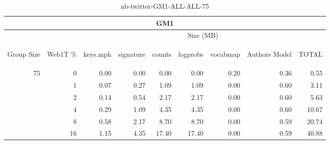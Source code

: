 \begin{center}
\begin{table}[htbp] 
 \begin{center}
\begin{tabular}{ | r | r | r | r | r | r | r | r | r |}
\hline
\multicolumn{9}{|c|}{GM1}\\
\hline
 & & \multicolumn{7}{|c|}{Size (MB)}\\ \cline{3-9}
\begin{sideways}Group Size\end{sideways} & \begin{sideways}Web1T \% \end{sideways} & \begin{sideways}keys.mph\end{sideways} & \begin{sideways}signature\end{sideways} & \begin{sideways}counts\end{sideways} & \begin{sideways}logprobs\end{sideways} & \begin{sideways}vocabmap\end{sideways} & \begin{sideways}Authors Model \end{sideways} & \begin{sideways}TOTAL\end{sideways}\\
\hline
\multirow{5}{*}{75}
 & 0 & 0.00 & 0.00 & 0.00 & 0.00 & 0.20 & 0.36 & 0.55\\ \cline{2-9}
 & 1 & 0.07 & 0.27 & 1.09 & 1.09 & 0.00 & 0.60 & 3.11\\ \cline{2-9}
 & 2 & 0.14 & 0.54 & 2.17 & 2.17 & 0.00 & 0.60 & 5.63\\ \cline{2-9}
 & 4 & 0.29 & 1.09 & 4.35 & 4.35 & 0.00 & 0.60 & 10.67\\ \cline{2-9}
 & 8 & 0.58 & 2.17 & 8.70 & 8.70 & 0.00 & 0.59 & 20.74\\ \cline{2-9}
 & 16 & 1.15 & 4.35 & 17.40 & 17.40 & 0.00 & 0.59 & 40.88\\ \cline{2-9}
\hline
\end{tabular}
\caption{nb-twitter-GM1-ALL-ALL-75}
\label{table:nb-twitter-GM1-ALL-ALL-75}
\end{center}
 \end{table}
\end{center}

